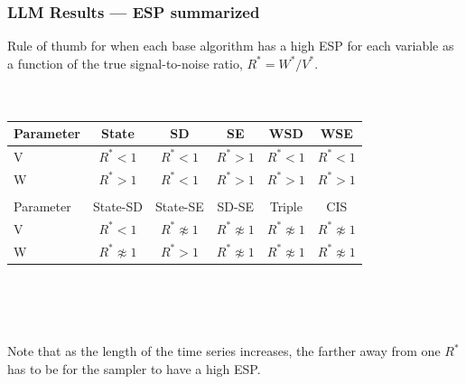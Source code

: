 \documentclass[xcolor=dvipsnames]{beamer}
\begin{document}
\begin{frame}
\frametitle{LLM Results --- ESP summarized}
Rule of thumb for when each base algorithm has a high ESP for each variable as a function of the true signal-to-noise ratio, $R^*=W^*/V^*$. \\~\\~\\
 \begin{center}
  \begin{tabular}{lccccc}\hline
    Parameter & State & SD & SE & WSD & WSE \\\hline
    V & $R^* < 1$ & $R^* < 1$ & $R^* > 1$ & $R^* < 1$ & $R^* < 1$\\
    W & $R^* > 1$ & $R^* < 1$ & $R^* > 1$ & $R^* > 1$ & $R^* > 1$ \\
      &           &          &           &           &           \\\hline
    Parameter & State-SD        & State-SE       & SD-SE        & Triple            & CIS \\\hline
    V         & $R^* < 1$           & $R^* \not\approx 1$ & $R^* \not\approx 1$ & $R^* \not\approx 1$ & $R^* \not\approx 1$ \\
    W         & $R^* \not\approx 1$ & $R^* > 1$           & $R^* \not\approx 1$ & $R^* \not\approx 1$ & $R^* \not\approx 1$\\\hline
  \end{tabular}\\~\\~\\
\end{center}

Note that as the length of the time series increases, the farther away from one $R^*$ has to be for the sampler to have a high ESP.
\end{frame}
\end{document}
